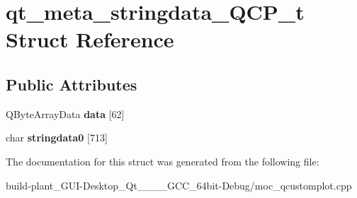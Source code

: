 \hypertarget{structqt__meta__stringdata__QCP__t}{}\section{qt\+\_\+meta\+\_\+stringdata\+\_\+\+Q\+C\+P\+\_\+t Struct Reference}
\label{structqt__meta__stringdata__QCP__t}
\subsection*{Public Attributes}
\begin{DoxyCompactItemize}
\item 
\mbox{\label{structqt__meta__stringdata__QCP__t_abc9c399ac75b9d32e347271273ccd5b6}} 
Q\+Byte\+Array\+Data {\bfseries data} \mbox{[}62\mbox{]}
\item 
\mbox{\label{structqt__meta__stringdata__QCP__t_a884365a57221bf71e4c60c1e2a9fc5f2}} 
char {\bfseries stringdata0} \mbox{[}713\mbox{]}
\end{DoxyCompactItemize}


The documentation for this struct was generated from the following file\+:\begin{DoxyCompactItemize}
\item 
build-\/plant\+\_\+\+G\+U\+I-\/\+Desktop\+\_\+\+Qt\+\_\+\_\+\_\+\_\+\+G\+C\+C\+\_\+64bit-\/\+Debug/moc\+\_\+qcustomplot.\+cpp\end{DoxyCompactItemize}
